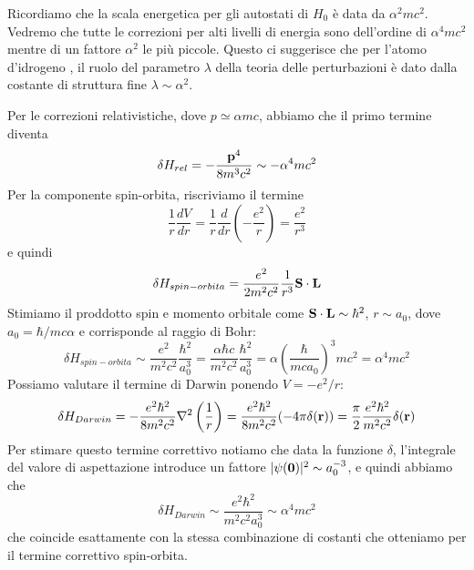 Ricordiamo che la scala energetica per gli autostati di $H_0$ \`e data da $\alpha^2 mc^2$. Vedremo che tutte le correzioni per alti livelli di energia sono dell'ordine di $\alpha^4 m c^2$ mentre di un fattore $\alpha^2$ le pi\`u piccole. Questo ci suggerisce che per l'atomo d'idrogeno , il ruolo del parametro $\lambda$ della teoria delle perturbazioni \`e dato dalla costante di struttura fine $\lambda \sim \alpha^2$.

Per le correzioni relativistiche, dove $p \simeq \alpha mc $, abbiamo che il primo termine diventa 
\begin{equation*}
	\delta H_{rel} = - \frac{\bold{p}^4}{8m^3 c^2} \sim - \alpha^4mc^2
\end{equation*}
Per la componente spin-orbita, riscriviamo il termine
\begin{equation*}
	\frac{1}{r}\frac{dV}{dr} = \frac{1}{r} \frac{d}{dr} \left( -\frac{e^2}{r}\right) = \frac{e^2}{r^3}
\end{equation*}
e quindi
\begin{equation*}
	\delta H_{spin-orbita} = \frac{e^2}{2m^2c^2} \frac{1}{r^3} \bold{S} \cdot \bold{L}
\end{equation*}
Stimiamo il proddotto spin e momento orbitale come $\bold{S} \cdot \bold{L} \sim \hbar^2 $, $r \sim a_0$, dove $a_0 = \hbar / mc \alpha$ e corrisponde al raggio di Bohr:
\begin{equation*}
	\delta H_{spin-orbita} \sim \frac{e^2}{m^2c^2} \frac{\hbar^2}{a_0^3} = \frac{\alpha \hbar c}{m^2 c^2}\frac{\hbar^2}{a_0^3} = \alpha \left( \frac{\hbar}{mca_0} \right )^3 mc^2 = \alpha^4 mc^2
\end{equation*}
Possiamo valutare il termine di Darwin ponendo $V = - e^2/r$:
\begin{equation*}
	\delta H_{Darwin} = - \frac{e^2 \hbar^2}{8 m^2 c^2} \nabla^2 \left( \frac{1}{r}\right) = \frac{e^2 \hbar^2}{8 m^2 c^2}(-4 \pi \delta(\bold{r})) = \frac{\pi}{2} \frac{e^2 \hbar^2}{m^2 c^2}\delta(\bold{r})
\end{equation*}
Per stimare questo termine correttivo notiamo che data la funzione $\delta $, l'integrale del valore di aspettazione introduce un fattore $|\psi(\bold{0})|^2 \sim a_0^{-3}$, e quindi abbiamo che
\begin{equation*}
	\delta H_{Darwin} \sim \frac{e^2 \hbar^2}{m^2 c^2 a_0^3} \sim \alpha^4 mc^2
\end{equation*}
che coincide esattamente con la stessa combinazione di costanti che otteniamo per il termine correttivo spin-orbita.

